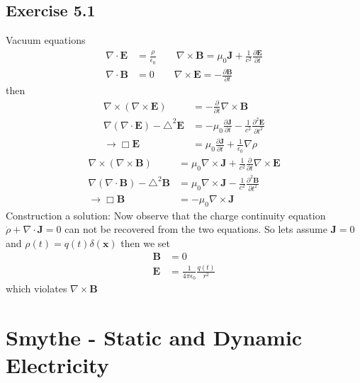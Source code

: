 \documentclass[../main.tex]{subfiles}
\begin{document}
\subsection{Exercise 5.1}
Vacuum equations
\begin{align}
\nabla\cdot\mathbf{E}&=\frac{\rho}{\epsilon_0}\qquad\nabla\times\mathbf{B}=\mu_0\mathbf{J}+\frac{1}{c^2}\frac{\partial\mathbf{E}}{\partial t}\\
\nabla\cdot\mathbf{B}&=0\qquad\nabla\times\mathbf{E}=-\frac{\partial\mathbf{B}}{\partial t}
\end{align}
then
\begin{align}
\nabla\times(\nabla\times\mathbf{E})&=-\frac{\partial}{\partial t}\nabla\times\mathbf{B}\\
\nabla(\nabla\cdot\mathbf{E})-\triangle^2\mathbf{E}&=-\mu_0\frac{\partial\mathbf{J}}{\partial t}-\frac{1}{c^2}\frac{\partial^2\mathbf{E}}{\partial t^2}\\
\rightarrow\Box\mathbf{E}&=\mu_0\frac{\partial\mathbf{J}}{\partial t}+\frac{1}{\epsilon_0}\nabla\rho
\end{align}
\begin{align}
\nabla\times(\nabla\times\mathbf{B})&=\mu_0\nabla\times\mathbf{J}+\frac{1}{c^2}\frac{\partial}{\partial t}\nabla\times\mathbf{E}\\
\nabla(\nabla\cdot\mathbf{B})-\triangle^2\mathbf{B}&=\mu_0\nabla\times\mathbf{J}-\frac{1}{c^2}\frac{\partial^2\mathbf{B}}{\partial t^2}\\
\rightarrow\Box\mathbf{B}&=-\mu_0\nabla\times\mathbf{J}
\end{align}
Construction a solution:
Now observe that the charge continuity equation $\dot\rho+\nabla\cdot\mathbf{J}=0$ can not be recovered from the two equations.
So lets assume $\mathbf{J}=0$ and $\rho(t)=q(t)\delta(\mathbf{x})$ then we set
\begin{align}
\mathbf{B}&=0\\
\mathbf{E}&=\frac{1}{4\pi\epsilon_0}\frac{q(t)}{r^2}
\end{align}
which violates $\nabla\times\mathbf{B}$


\section{{\sc Smythe} - Static and Dynamic Electricity}
\end{document}
